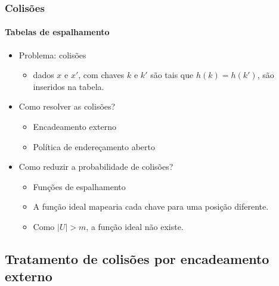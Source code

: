 \documentclass{beamer}
\begin{document}
\begin{frame}

  \frametitle{Colisões}
  \framesubtitle{Tabelas de espalhamento}

  \begin{itemize}

    \item Problema: \alert{colisões}

      \begin{itemize}

      \item dados $x$ e $x'$, com chaves $k$ e $k'$ são tais que $h(k) = h(k')$,
         são inseridos na tabela.

      \end{itemize}

    \item Como resolver as colisões?

      \begin{itemize}

        \item Encadeamento externo

        \item Política de endereçamento aberto

      \end{itemize}

    \item Como reduzir a probabilidade de colisões?

      \begin{itemize}

      \item Funções de espalhamento

      \item A função ideal mapearia cada chave para uma posição
        diferente.

      \item Como $| U | > m$, a função ideal não existe.

      \end{itemize}

  \end{itemize}
      
\end{frame}

\subsection{Tratamento de colisões por encadeamento externo}
\end{document}
